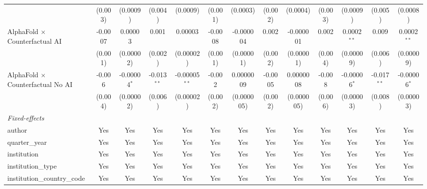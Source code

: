 \begin{tabular}{lcccccccccccc}
                                            & (0.003)       & (0.0009)       & (0.004)       & (0.0009)        & (0.001)  & (0.0003)       & (0.002) & (0.0004)       & (0.003)       & (0.0009)       & (0.005)       & (0.0008)\\   
   AlphaFold $\times$ Counterfactual AI     & -0.0007       & 0.00003        & 0.001         & 0.00003         & -0.0008  & -0.000004      & 0.002   & -0.000001      & 0.002         & 0.0002$^{**}$  & 0.009         & 0.0002$^{**}$\\   
                                            & (0.001)       & (0.00002)      & (0.002)       & (0.00002)       & (0.001)  & (0.00001)      & (0.002) & (0.00001)      & (0.004)       & (0.00009)      & (0.006)       & (0.00009)\\   
   AlphaFold $\times$ Counterfactual No AI  & -0.006        & -0.00004$^{*}$ & -0.013$^{**}$ & -0.00005$^{**}$ & -0.002   & 0.0000009      & -0.0005 & 0.0000008      & -0.008        & -0.00006$^{*}$ & -0.017$^{**}$ & -0.00006$^{*}$\\   
                                            & (0.004)       & (0.00002)      & (0.006)       & (0.00002)       & (0.002)  & (0.000005)     & (0.002) & (0.000005)     & (0.006)       & (0.00003)      & (0.008)       & (0.00003)\\   
   \midrule
   \emph{Fixed-effects}\\
   author                                   & Yes           & Yes            & Yes           & Yes             & Yes      & Yes            & Yes     & Yes            & Yes           & Yes            & Yes           & Yes\\  
   quarter\_year                            & Yes           & Yes            & Yes           & Yes             & Yes      & Yes            & Yes     & Yes            & Yes           & Yes            & Yes           & Yes\\  
   institution                              & Yes           & Yes            & Yes           & Yes             & Yes      & Yes            & Yes     & Yes            & Yes           & Yes            & Yes           & Yes\\  
   institution\_type                        & Yes           & Yes            & Yes           & Yes             & Yes      & Yes            & Yes     & Yes            & Yes           & Yes            & Yes           & Yes\\  
   institution\_country\_code               & Yes           & Yes            & Yes           & Yes             & Yes      & Yes            & Yes     & Yes            & Yes           & Yes            & Yes           & Yes\\  

\end{tabular}
